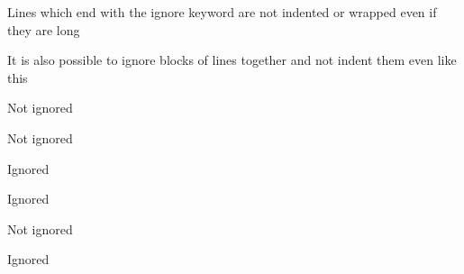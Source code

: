 \documentclass{article}
\begin{document}
Lines which end with the ignore keyword are not indented or wrapped even if they are long %

It is also possible to ignore blocks
  of lines together and not indent them
    even like this

  Not ignored


  Not ignored


  Ignored


  Ignored


  Not ignored


  Ignored
\end{document}
